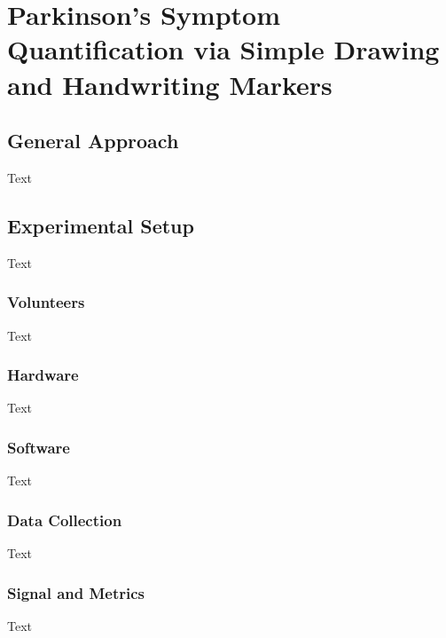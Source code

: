 \chapter{Parkinson's Symptom Quantification via Simple Drawing and Handwriting Markers}
\label{ch:handwriting}
\pagestyle{fancy}
\fancyhf{}
\fancyhead[OC]{\leftmark}
\fancyhead[EC]{\rightmark}
\cfoot{\thepage}

\section{General Approach}
\label{sec:genApproach}
Text
\section{Experimental Setup}
\label{sec:expSetup}
Text
\subsection{Volunteers}
\label{subsec:volunteers}
Text
\subsection{Hardware}
\label{subsec:hardware}
Text
\subsection{Software}
\label{subsec:software}
Text
\subsection{Data Collection}
\label{subsec:dataCollection}
Text
\subsection{Signal and Metrics}
\label{subsec:signalMetrics}
Text
